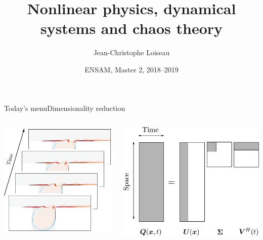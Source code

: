 \documentclass[usenames,dvipsnames,svgnames,10pt,aspectratio=169]{beamer}
\title[Nonlinear Physics] %
{
	Nonlinear physics, dynamical \\ systems and chaos theory
}
\author[J.-Ch.~Loiseau] %
{
	Jean-Christophe Loiseau
}
\institute[unused]
{
	\url{jean-christophe.loiseau@ensam.eu} \\
	DynFluid, \\
	Arts et M\'etiers ParisTech, France
}
\date[unused]{ENSAM, Master 2, 2018--2019}
\begin{document}
\titleframe %


\begin{frame}[t, c]{Today's menu}{Dimensionality reduction}
	\centering
	\begin{columns}
		\begin{column}{.33\textwidth}
			\centering
			\includegraphics[width=\columnwidth]{dimensionality_reduction}
		\end{column}
		\begin{column}{.4\textwidth}
			\centering
			\includegraphics[width=\columnwidth]{svd}
		\end{column}
	\end{columns}


\end{frame}
\end{document}

